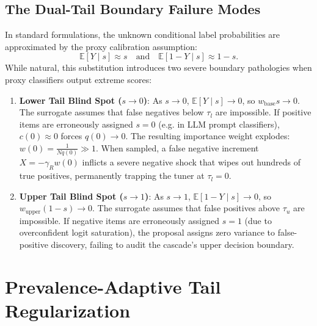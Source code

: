 \documentclass[11pt,a4paper]{article}
\newcommand{\E}{\mathbb{E}}
\begin{document}
\subsection{The Dual-Tail Boundary Failure Modes}
In standard formulations, the unknown conditional label probabilities are approximated by the proxy calibration assumption:
\begin{equation}
\E[Y \mid s] \approx s \quad \text{and} \quad \E[1 - Y \mid s] \approx 1 - s.
\end{equation}
While natural, this substitution introduces two severe boundary pathologies when proxy classifiers output extreme scores:
\begin{enumerate}[leftmargin=*]
    \item \textbf{Lower Tail Blind Spot ($s \to 0$)}:
    As $s \to 0$, $\E[Y \mid s] \to 0$, so $w_{\text{base}} s \to 0$. The surrogate assumes that false negatives below $\tau_l$ are impossible. If positive items are erroneously assigned $s=0$ (e.g. in LLM prompt classifiers), $c(0) \approx 0$ forces $q(0) \to 0$. The resulting importance weight explodes: $w(0) = \frac{1}{N q(0)} \gg 1$. 
    When sampled, a false negative increment $X = -\gamma_R w(0)$ inflicts a severe negative shock that wipes out hundreds of true positives, permanently trapping the tuner at $\tau_l = 0$.
    \item \textbf{Upper Tail Blind Spot ($s \to 1$)}:
    As $s \to 1$, $\E[1 - Y \mid s] \to 0$, so $w_{\text{upper}} (1 - s) \to 0$. The surrogate assumes that false positives above $\tau_u$ are impossible. If negative items are erroneously assigned $s=1$ (due to overconfident logit saturation), the proposal assigns zero variance to false-positive discovery, failing to audit the cascade's upper decision boundary.
\end{enumerate}

\section{Prevalence-Adaptive Tail Regularization}
\end{document}
